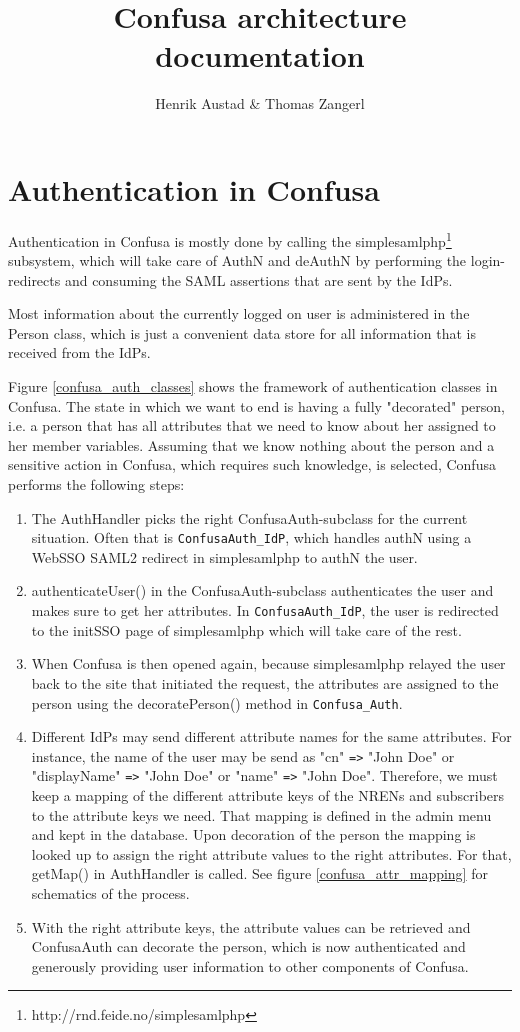 \documentclass{scrartcl}
\title{Confusa architecture documentation}
\author{Henrik Austad \& Thomas Zangerl}
\begin{document}
\maketitle
\newpage
\tableofcontents
\newpage

\section{Authentication in Confusa}

Authentication in Confusa is mostly done by calling the simplesamlphp\footnote{http://rnd.feide.no/simplesamlphp} subsystem, which will take care of AuthN and deAuthN by performing the login-redirects and consuming the SAML assertions that are sent by the IdPs.

Most information about the currently logged on user is administered in the Person class, which is just a convenient data store for all information that is received from the IdPs.

Figure \ref{confusa_auth_classes} shows the framework of authentication classes in Confusa. The state in which we want to end is having a fully "decorated" person, i.e. a person that has all attributes that we need to know about her assigned to her member variables. Assuming that we know nothing about the person and a sensitive action in Confusa, which requires such knowledge, is selected, Confusa performs the following steps:

\begin{enumerate}
	\item[1] The AuthHandler picks the right ConfusaAuth-subclass for the current situation. Often that is \verb+ConfusaAuth_IdP+, which handles authN using a WebSSO SAML2 redirect in simplesamlphp to authN the user.
	\item[2] authenticateUser() in the ConfusaAuth-subclass authenticates the user and makes sure to get her attributes. In \verb+ConfusaAuth_IdP+, the user is redirected to the initSSO page of simplesamlphp which will take care of the rest.
	\item[3] When Confusa is then opened again, because simplesamlphp relayed the user back to the site that initiated the request, the attributes are assigned to the person using the decoratePerson() method in \verb+Confusa_Auth+.
	\item[4] Different IdPs may send different attribute names for the same attributes. For instance, the name of the user may be send as "cn" \verb+=>+ "John Doe" or "displayName" \verb+=>+ "John Doe" or "name" \verb+=>+ "John Doe". Therefore, we must keep a mapping of the different attribute keys of the NRENs and subscribers to the attribute keys we need. That mapping is defined in the admin menu and kept in the database. Upon decoration of the person the mapping is looked up to assign the right attribute values to the right attributes. For that, getMap() in AuthHandler is called. See figure \ref{confusa_attr_mapping} for schematics of the process.
	\item[5] With the right attribute keys, the attribute values can be retrieved and ConfusaAuth can decorate the person, which is now authenticated and generously providing user information to other components of Confusa.
\end{enumerate}
\end{document}
